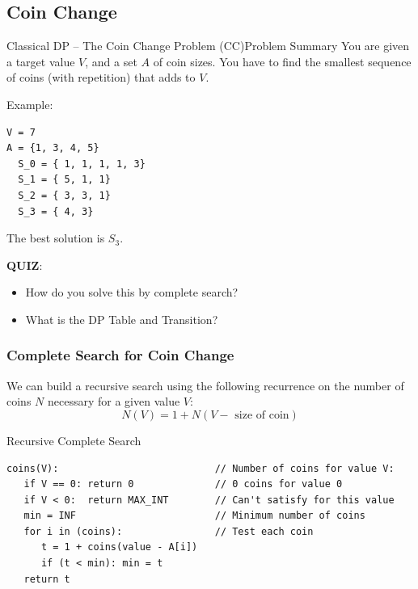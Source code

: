 \subsection{Coin Change}
\begin{frame}[fragile]{Classical DP -- The Coin Change Problem (CC)}{Problem Summary}
  You are given a target value $V$, and a set $A$ of coin sizes. You have to find the smallest sequence of coins (with repetition) that adds to $V$.
  \bigskip

Example:
\begin{verbatim}
V = 7
A = {1, 3, 4, 5}
  S_0 = { 1, 1, 1, 1, 3}
  S_1 = { 5, 1, 1}
  S_2 = { 3, 3, 1}
  S_3 = { 4, 3}
\end{verbatim}

The best solution is $S_3$.\bigskip

{\bf QUIZ}:
\begin{itemize}
  \item How do you solve this by complete search?
  \item What is the DP Table and Transition?
\end{itemize}
\end{frame}

\begin{frame}[fragile]
  \frametitle{Complete Search for Coin Change}

  We can build a recursive search using the following recurrence on the number of coins $N$ necessary for a given value $V$:
  \[N(V) = 1 + N(V-\text{ size of coin})\]

  \begin{block}{Recursive Complete Search}
    {\smaller
\begin{verbatim}
coins(V):                           // Number of coins for value V:
   if V == 0: return 0              // 0 coins for value 0
   if V < 0:  return MAX_INT        // Can't satisfy for this value
   min = INF                        // Minimum number of coins
   for i in (coins):                // Test each coin
      t = 1 + coins(value - A[i])
      if (t < min): min = t
   return t
\end{verbatim}
  }
  \end{block}
\end{frame}


